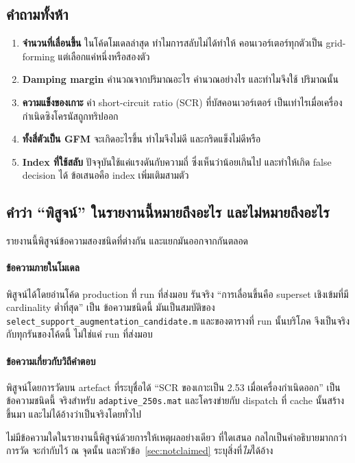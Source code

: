 \documentclass[12pt,a4paper]{article}
\theoremstyle{remark}
\newcommand{\code}[1]{\texttt{\small #1}}
\begin{document}
\subsection{คำถามทั้งห้า}

\begin{enumerate}[leftmargin=1.9em]
\item \textbf{จำนวนที่เลื่อนขึ้น} ในโค้ดโมเดลล่าสุด ทำไมการสลับไม่ได้ทำให้
      คอนเวอร์เตอร์ทุกตัวเป็น grid-forming แต่เลือกแค่หนึ่งหรือสองตัว
\item \textbf{Damping margin} คำนวณจากปริมาณอะไร คำนวณอย่างไร และทำไมจึงใช้
      ปริมาณนั้น
\item \textbf{ความแข็งของเกาะ} ค่า short-circuit ratio (SCR) ที่บัสคอนเวอร์เตอร์
      เป็นเท่าไรเมื่อเครื่องกำเนิดซิงโครนัสถูกทริปออก
\item \textbf{ทั้งสี่ตัวเป็น GFM} จะเกิดอะไรขึ้น ทำไมจึงไม่ดี และกริดแข็งไม่ดีหรือ
\item \textbf{Index ที่ใช้สลับ} ปัจจุบันใช้แค่แรงดันกับความถี่ ซึ่งเห็นว่าน้อยเกินไป
      และทำให้เกิด false decision ได้ ข้อเสนอคือ index เพิ่มเติมสามตัว
\end{enumerate}

\subsection{คำว่า ``พิสูจน์'' ในรายงานนี้หมายถึงอะไร และไม่หมายถึงอะไร}

รายงานนี้พิสูจน์ข้อความสองชนิดที่ต่างกัน และแยกมันออกจากกันตลอด

\paragraph{ข้อความภายในโมเดล} พิสูจน์ได้โดยอ่านโค้ด production ที่ run ที่ส่งมอบ
รันจริง ``การเลื่อนขึ้นคือ superset เชิงเข้มที่มี cardinality ต่ำที่สุด'' เป็น
ข้อความชนิดนี้ มันเป็นสมบัติของ \code{select\_support\_augmentation\_candidate.m}
และของตารางที่ run นั้นบริโภค จึงเป็นจริงกับทุกรันของโค้ดนี้ ไม่ใช่แค่ run ที่ส่งมอบ

\paragraph{ข้อความเกี่ยวกับวิถีคำตอบ} พิสูจน์โดยการวัดบน artefact ที่ระบุชื่อได้
``SCR ของเกาะเป็น 2.53 เมื่อเครื่องกำเนิดออก'' เป็นข้อความชนิดนี้ จริงสำหรับ
\code{adaptive\_250s.mat} และโครงข่ายกับ dispatch ที่ cache นั้นสร้างขึ้นมา
และไม่ได้อ้างว่าเป็นจริงโดยทั่วไป

ไม่มีข้อความใดในรายงานนี้พิสูจน์ด้วยการให้เหตุผลอย่างเดียว ที่ใดเสนอ
กลไกเป็นคำอธิบายมากกว่าการวัด จะกำกับไว้ ณ จุดนั้น และหัวข้อ~\ref{sec:notclaimed}
ระบุสิ่งที่\emph{ไม่}ได้อ้าง
\end{document}
